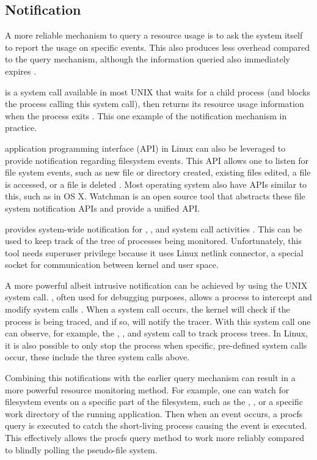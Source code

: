\subsection{Notification}

A more reliable mechanism to query a resource usage is to ask the system itself to report the usage on specific events.
This also produces less overhead compared to the query mechanism, although the information queried also immediately expires \citep{juvePracticalResourceMonitoring2015}.

 is a system call available in most UNIX that waits for a child process (and blocks the process calling this system call), then returns its resource usage information when the process exits \citep{manpages}.
This one example of the notification mechanism in practice.

 application programming interface (API) in Linux can also be leveraged to provide notification regarding filesystem events.
This API allows one to listen for file system events, such as new file or directory created, existing files edited, a file is accessed, or a file is deleted \citep{manpages}.
Most operating system also have APIs similar to this, such as  in OS X. Watchman \citep{WatchesFilesRecords2019} is an open source tool that abstracts these file system notification APIs and provide a unified API.

 provides system-wide notification for , , and  system call activities \citep{UbuntuManpageForkstat}.
This can be used to keep track of the tree of processes being monitored.
Unfortunately, this tool needs superuser privilege because it uses Linux netlink connector, a special socket for communication between kernel and user space.

A more powerful albeit intrusive notification can be achieved by using the UNIX  system call.
, often used for debugging purposes, allows a process to intercept and modify system calls \citep{manpages}.
When a system call occurs, the kernel will check if the process is being traced, and if so, will notify the tracer.
With this system call one can observe, for example, the , , and  system call to track process trees.
In Linux, it is also possible to only stop the process when specific, pre-defined system calls occur, these include the three system calls above.

Combining this notifications with the earlier query mechanism can result in a more powerful resource monitoring method.
For example, one can watch for filesystem events on a specific part of the filesystem, such as the , , or a specific work directory of the running application. Then when an event occurs, a procfs query is executed to catch the short-living process causing the event is executed.
This effectively allows the procfs query method to work more reliably compared to blindly polling the pseudo-file system.

